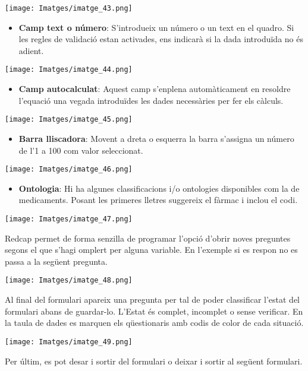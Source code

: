 \documentclass[
]{article}
\providecommand{\tightlist}{%
  \setlength{\itemsep}{0pt}\setlength{\parskip}{0pt}}
\begin{document}
\texttt{[image: Imatges/imatge\_43.png]}

\begin{itemize}
\tightlist
\item
  \textbf{Camp text o número}: S'introdueix un número o un text en el quadro. Si les regles de validació estan activades, ens indicarà si la dada introduïda no és adient.
\end{itemize}

\texttt{[image: Imatges/imatge\_44.png]}

\begin{itemize}
\tightlist
\item
  \textbf{Camp autocalculat}: Aquest camp s'enplena automàticament en resoldre l'equació una vegada introduïdes les dades necessàries per fer els càlculs.
\end{itemize}

\texttt{[image: Imatges/imatge\_45.png]}

\begin{itemize}
\tightlist
\item
  \textbf{Barra lliscadora}: Movent a dreta o esquerra la barra s'assigna un número de l'1 a 100 com valor seleccionat.
\end{itemize}

\texttt{[image: Imatges/imatge\_46.png]}

\begin{itemize}
\tightlist
\item
  \textbf{Ontologia}: Hi ha algunes classificacions i/o ontologies disponibles com la de medicaments. Posant les primeres lletres suggereix el fàrmac i inclou el codi.
\end{itemize}

\texttt{[image: Imatges/imatge\_47.png]}

Redcap permet de forma senzilla de programar l'opció d'obrir noves preguntes segons el que s'hagi omplert per alguna variable. En l'exemple si es respon no es passa a la següent pregunta.

\texttt{[image: Imatges/imatge\_48.png]}

Al final del formulari apareix una pregunta per tal de poder classificar l'estat del formulari abans de guardar-lo. L'Estat és complet, incomplet o sense verificar. En la taula de dades es marquen els qüestionaris amb codis de color de cada situació.

\texttt{[image: Imatges/imatge\_49.png]}

Per últim, es pot desar i sortir del formulari o deixar i sortir al següent formulari.
\end{document}
